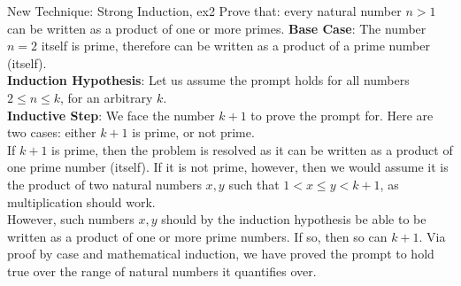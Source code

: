 \begin{ln-think}{New Technique: Strong Induction, ex2}{}
    Prove that: every natural number $n > 1$ can be written as a product of one or more primes.
    \tcblower
    \textbf{Base Case}: The number $n = 2$ itself is prime, therefore can be written as a product of a prime number (itself). \\
    \textbf{Induction Hypothesis}: Let us assume the prompt holds for all numbers $2 \leq n \leq k$, for an arbitrary $k$. \\
    \textbf{Inductive Step}: We face the number $k + 1$ to prove the prompt for. Here are two cases: either $k + 1$ is prime, or not prime. \\
    If $k + 1$ is prime, then the problem is resolved as it can be written as a product of one prime number (itself). If it is not prime, however, then we would assume it is the product of two natural numbers $x, y$ such that $1 < x \leq y < k + 1$, as multiplication should work. \\
    However, such numbers $x, y$ should by the induction hypothesis be able to be written as a product of one or more prime numbers. If so, then so can $k + 1$. Via proof by case and mathematical induction, we have proved the prompt to hold true over the range of natural numbers it quantifies over.
\end{ln-think}
